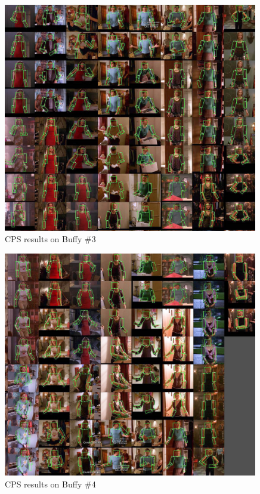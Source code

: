 \begin{figure}[tb]
\begin{center}
\includegraphics[width=0.99\textwidth]{figs/buffy_test_tiled_cps-4.jpg}
\caption[CPS results on Buffy\#3]{CPS results on Buffy \#3}
\label{fig:buffy-cps3}
\end{center}
\end{figure}\begin{figure}[tb]
\begin{center}
\includegraphics[width=0.99\textwidth]{figs/buffy_test_tiled_cps-3.jpg}
\caption[CPS results on Buffy\#4]{CPS results on Buffy \#4}
\label{fig:buffy-cps4}
\end{center}
\end{figure}

